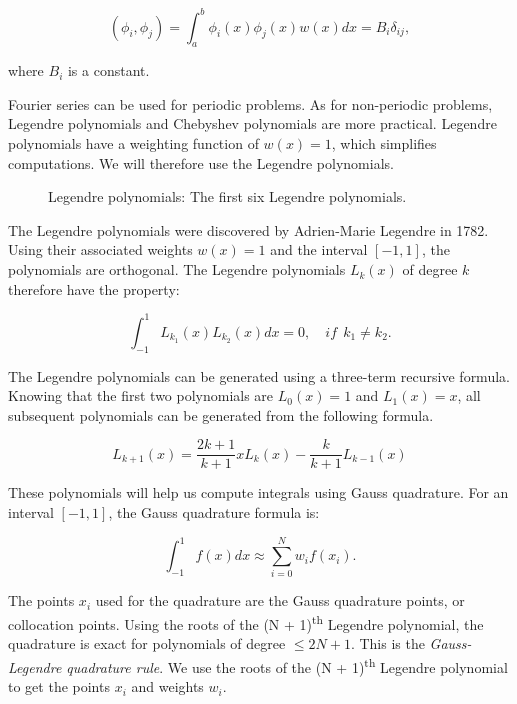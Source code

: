 \begin{equation}
	\left( \phi_i, \phi_j \right) = \int_a^b \phi_i(x) \phi_j(x) w(x) dx = B_{i} \delta_{i j},
\end{equation}

\noindent
where \(B_i\) is a constant.

Fourier series can be used for periodic problems. As for non-periodic problems, Legendre polynomials
and Chebyshev polynomials are more practical. Legendre polynomials have a weighting function of
\(w(x) = 1\), which simplifies computations. We will therefore use the Legendre polynomials.

\begin{figure}[H]
	\centering
	
	\caption{Legendre polynomials: The first six Legendre polynomials.}\label{fig:polynomials}
\end{figure}

The Legendre polynomials were discovered by Adrien-Marie Legendre in 1782. Using their associated
weights \(w(x) = 1\) and the interval \(\left[ -1, 1 \right]\), the polynomials are orthogonal. The
Legendre polynomials \(L_k \left( x \right)\) of degree \(k\) therefore have the property:

\begin{equation}
	\int_{-1}^{1}L_{k_1}(x) L_{k_2}(x) dx = 0, \quad if \: \: k_1 \neq k_2.
\end{equation}

The Legendre polynomials can be generated using a three-term recursive formula. Knowing that the
first two polynomials are \(L_0 \left( x \right) = 1\) and \(L_1 \left( x \right) = x\), all
subsequent polynomials can be generated from the following formula.

\begin{equation} \label{equ:three_terms}
	L_{k + 1}(x) = \frac{2k + 1}{k + 1}xL_k(x) - \frac{k}{k + 1}L_{k - 1}(x)
\end{equation}

These polynomials will help us compute integrals using Gauss quadrature. For an interval \(\left[
-1, 1 \right]\), the Gauss quadrature formula is:

\begin{equation}
	\int_{-1}^{1}f(x)dx \approx \sum_{i = 0}^{N}w_i f(x_i).
\end{equation}

The points \(x_i\) used for the quadrature are the Gauss quadrature points, or collocation points.
Using the roots of the (N + 1)\textsuperscript{th} Legendre polynomial, the quadrature is exact for
polynomials of degree \(\leq 2 N + 1\). This is the \textit{Gauss-Legendre quadrature rule}. We use
the roots of the (N + 1)\textsuperscript{th} Legendre polynomial to get the points \(x_i\) and
weights \(w_i\).

